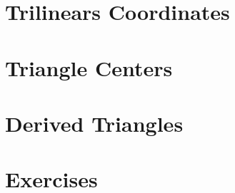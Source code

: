 \section{Trilinears Coordinates}
\label{app:A-trilins}


\section{Triangle Centers}
\label{app:A-tri-ctrs}


\section{Derived Triangles}
\label{app:A-derived}


\section{Exercises}
\label{app:A-exercises}


